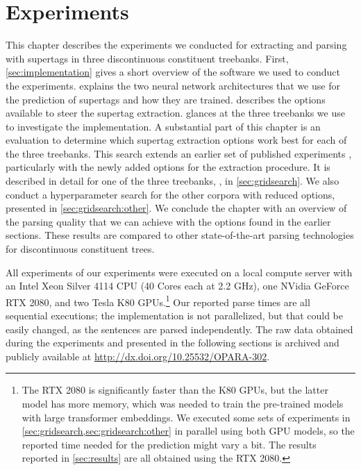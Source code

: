 \documentclass[../document.tex]{subfiles}
\begin{document}
    \chapter{Experiments}\label{sec:experiments}
    This chapter describes the experiments we conducted for extracting and parsing with supertags in three discontinuous constituent treebanks.
    First, \cref{sec:implementation} gives a short overview of the software we used to conduct the experiments.
     explains the two neural network architectures that we use for the prediction of supertags and how they are trained.
     describes the options available to steer the supertag extraction.
     glances at the three treebanks we use to investigate the implementation.
    A substantial part of this chapter is an evaluation to determine which supertag extraction options work best for each of the three treebanks.
    This search extends an earlier set of published experiments \citep{Rup22}, particularly with the newly added options for the extraction procedure.
    It is described in detail for one of the three treebanks, \negra{}, in \cref{sec:gridsearch}.
    We also conduct a hyperparameter search for the other corpora with reduced options, presented in \cref{sec:gridsearch:other}.
    We conclude the chapter with an overview of the parsing quality that we can achieve with the options found in the earlier sections.
    These results are compared to other state-of-the-art parsing technologies for discontinuous constituent trees.

    All experiments of our experiments were executed on a local compute server with an Intel Xeon Silver 4114 CPU (40 Cores each at 2.2 GHz), one NVidia GeForce RTX 2080, and two Tesla K80 GPUs.\footnote{
        The RTX 2080 is significantly faster than the K80 GPUs, but the latter model has more memory, which was needed to train the pre-trained models with large transformer embeddings.
        We executed some sets of experiments in \cref{sec:gridsearch,sec:gridsearch:other} in parallel using both GPU models, so the reported time needed for the prediction might vary a bit.
        The results reported in \cref{sec:results} are all obtained using the RTX 2080.
    }
    Our reported parse times are all sequential executions; the implementation is not parallelized, but that could be easily changed, as the sentences are parsed independently.
    The raw data obtained during the experiments and presented in the following sections is archived and publicly available at \url{http://dx.doi.org/10.25532/OPARA-302}.

    
    
    
    
    
    
    

    \ifSubfilesClassLoaded{%
        \printindex
    }{}
\end{document}
